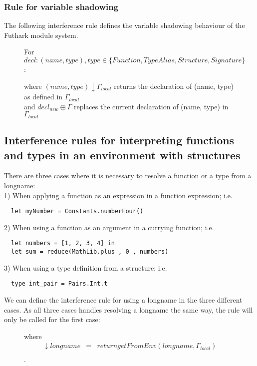 \subsubsection{Rule for variable shadowing}
The following interference rule defines the
variable shadowing behaviour of the Futhark module system.

\begin{figure}\label{Rule4a}
  \begin{tcolorbox}
    For $decl : (name, type) , type \in \{Function, TypeAlias, Structure, Signature \}$:
    \begin{prooftree}
    \end{prooftree}
      where $(name, type) \downarrow \Gamma_{local}$ returns the declaration of
      (name, type) as defined in $\Gamma_{local}$ \\
      and $decl_{new} \oplus \Gamma$ replaces the current declaration of (name,
      type) in $\Gamma_{local}$ 
  \end{tcolorbox}
\end{figure}
\subsection{Interference rules for interpreting functions and types in an
  environment with structures}\label{interpretingfunctionsandtypeswithstructures}
There are three cases where it is necessary to resolve a function or a type from a
longname:\\
1) When applying a function as an expression in a function expression; i.e.
\begin{verbatim}
  let myNumber = Constants.numberFour()
\end{verbatim}
2) When using a function as an argument in a currying function; i.e.
\begin{verbatim}
  let numbers = [1, 2, 3, 4] in
  let sum = reduce(MathLib.plus , 0 , numbers)
\end{verbatim}
3) When using a type definition from a structure; i.e.
\begin{verbatim}
  type int_pair = Pairs.Int.t 
\end{verbatim}
We can define the interference rule for using a longname in the three different
cases. As all three cases handles resolving a longname the same way, the rule
will only be called for the first case:
\begin{figure}\label{Rule5}
  \begin{prooftree}
  \end{prooftree}
  where
  \begin{align*}
    \downarrow longname & = & return getFromEnv(longname , \Gamma_{local}) \\
  \end{align*}.
\end{figure}
